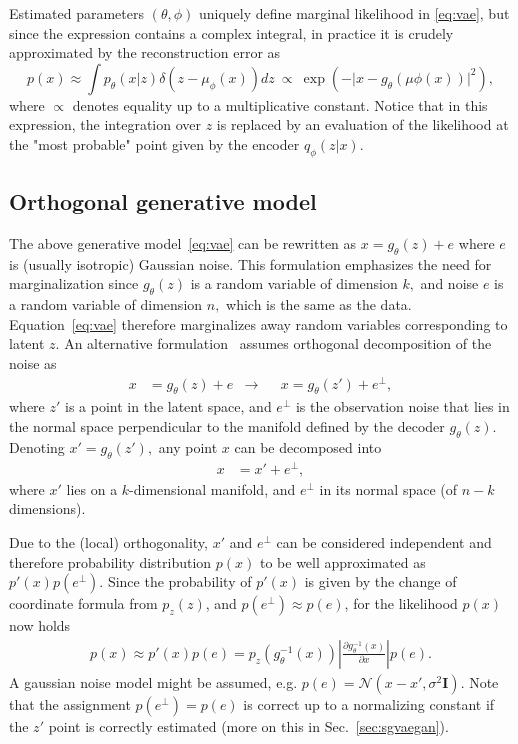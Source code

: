 Estimated parameters $(\theta,\phi)$ uniquely define marginal likelihood in \eqref{eq:vae}, but since the expression contains a complex integral, in practice it is crudely approximated by the reconstruction error as 
\begin{equation}
p(x)\approx\int p_{\theta}(x\vert z)\delta(z-\mu_{\phi}(x))dz\ \propto\ \exp\left(-\vert x-g_{\theta}(\mu{\phi}(x))\vert ^{2}\right), \label{eq:px-vita}
\end{equation}
where $\propto$ denotes equality up to a multiplicative constant. Notice that in this expression, the integration over $z$ is replaced by an evaluation of the likelihood at the "most probable" point given by the encoder $q_{\phi}(z\vert x).$

\subsection{Orthogonal generative model}
The above generative model~\eqref{eq:vae} can be rewritten as $x=g_{\theta}(z)+e$ where $e$ is (usually isotropic) Gaussian noise. This formulation  emphasizes the need for marginalization since $g_{\theta}(z)$ is a random variable of dimension $k,$ and noise $e$ is a random variable of dimension $n,$ which is the same as the data. Equation~\eqref{eq:vae} therefore marginalizes away random variables corresponding to latent $z.$ An alternative formulation~\cite{pidhorskyi2018generative, vsmidl2019anomaly} assumes orthogonal decomposition of the noise as
\begin{align}
x&=g_{\theta}(z)+e & \rightarrow & &x=g_{\theta}(z')+e^{\bot},
\end{align}
where $z'$ is a point in the latent space, and $e^{\bot}$ is the observation noise that lies in the normal space perpendicular to the manifold defined by the decoder $g_{\theta}(z)$. Denoting $x'=g_{\theta}(z'),$ any point $x$ can be decomposed  into 
\begin{align*}
x & =x'+e^{\bot},
\end{align*}
where $x'$ lies on a $k$-dimensional manifold, and $e^{\bot}$ in its normal space (of $n-k$ dimensions). 

Due to the (local) orthogonality, $x'$ and $e^{\bot}$ can be considered independent and therefore probability distribution $p(x)$ to be well approximated as $p'(x)p(e^{\bot})$. Since the probability of $p'(x)$ is given by the change of coordinate formula from $p_{z}(z)$, and $p(e^{\bot})\approx p(e)$, for the likelihood $p(x)$ now holds
\begin{align}
p(x)\approx p'(x)p(e)=p_{z}(g_{\theta}^{-1}(x))\left\vert \frac{\partial g_{\theta}^{-1}(x)}{\partial x}\right\vert p(e).\label{eq:pxjacodeco}
\end{align}
A gaussian noise model might be assumed, e.g. $p(e) = \mathcal{N}(x-x',\sigma^{2}\mathbf{I})$. Note that the assignment $p(e^{\bot})=p(e)$ is correct up to a normalizing constant if the $z'$ point is correctly estimated (more on this in Sec.~\ref{sec:sgvaegan}).

